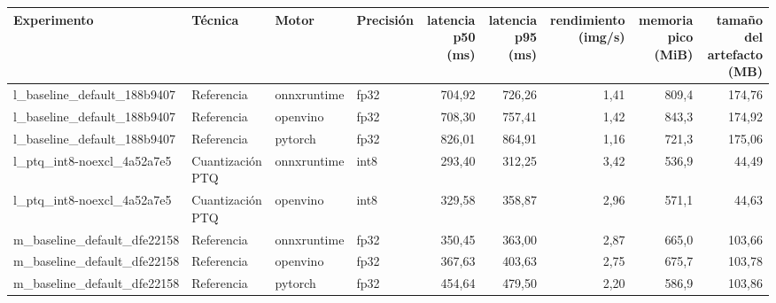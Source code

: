 \ifdefined\tfmedgetitle\else\newsavebox{\tfmedgetitle}\fi
\ifdefined\tfmedgenotes\else\newsavebox{\tfmedgenotes}\fi
\begin{landscape}
\begin{table}[htbp]
  \centering
  \usebox{\tfmedgetitle}\par
  \footnotesize
  \begin{adjustbox}{max width=\linewidth, max totalheight=\dimexpr\textheight-\ht\tfmedgetitle-\dp\tfmedgetitle-\ht\tfmedgenotes-\dp\tfmedgenotes-6pt\relax}
  \begin{tabular}{llllrrrrr}
    \toprule
    Experimento & Técnica & Motor & Precisión & latencia p50 (ms) & latencia p95 (ms) & rendimiento (img/s) & memoria pico (MiB) & tamaño del artefacto (MB) \\
    \midrule
    l\_baseline\_default\_188b9407 & Referencia & onnxruntime & fp32 & 704,92 & 726,26 & 1,41 & 809,4 & 174,76 \\
    l\_baseline\_default\_188b9407 & Referencia & openvino & fp32 & 708,30 & 757,41 & 1,42 & 843,3 & 174,92 \\
    l\_baseline\_default\_188b9407 & Referencia & pytorch & fp32 & 826,01 & 864,91 & 1,16 & 721,3 & 175,06 \\
    l\_ptq\_int8-noexcl\_4a52a7e5 & Cuantización PTQ & onnxruntime & int8 & 293,40 & 312,25 & 3,42 & 536,9 & 44,49 \\
    l\_ptq\_int8-noexcl\_4a52a7e5 & Cuantización PTQ & openvino & int8 & 329,58 & 358,87 & 2,96 & 571,1 & 44,63 \\
    m\_baseline\_default\_dfe22158 & Referencia & onnxruntime & fp32 & 350,45 & 363,00 & 2,87 & 665,0 & 103,66 \\
    m\_baseline\_default\_dfe22158 & Referencia & openvino & fp32 & 367,63 & 403,63 & 2,75 & 675,7 & 103,78 \\
    m\_baseline\_default\_dfe22158 & Referencia & pytorch & fp32 & 454,64 & 479,50 & 2,20 & 586,9 & 103,86 \\

\end{tabular}
\end{adjustbox}
\end{table}
\end{landscape}
